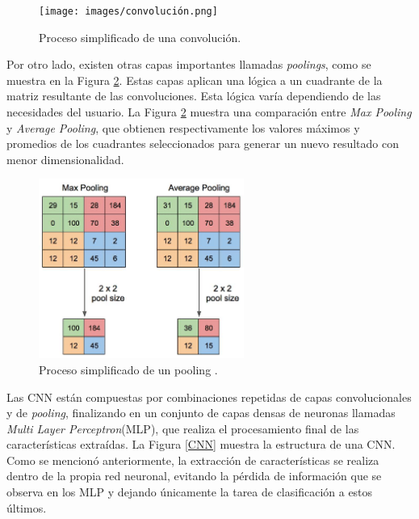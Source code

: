 \begin{figure}[h!] 
    \texttt{[image: images/convolución.png]} 
    \centering 
    \caption{Proceso simplificado de una convolución\protect\cite{convoluciones}.} 
    \label{convolucion} 
\end{figure}

Por otro lado, existen otras capas importantes llamadas
\textit{poolings}, como se muestra en la Figura \ref{pooling}.
Estas capas aplican una lógica a un cuadrante de la matriz
resultante de las convoluciones. Esta lógica varía dependiendo
de las necesidades del usuario. La Figura \ref{pooling} muestra una comparación
entre \textit{Max Pooling} y \textit{Average Pooling}, que obtienen
respectivamente los valores máximos y promedios de los cuadrantes
seleccionados para generar un nuevo resultado con menor dimensionalidad.

\begin{figure}[h!] 
    \includegraphics[width=0.6\textwidth]{images/pooling.png} 
    \centering 
    \caption{Proceso simplificado de un pooling \protect\cite{pooling}.} 
    \label{pooling} 
\end{figure}

Las CNN están compuestas por combinaciones repetidas de capas
convolucionales y de \textit{pooling}, finalizando en un conjunto 
de capas densas de neuronas llamadas \textit{Multi Layer 
Perceptron}(MLP), que realiza el procesamiento final de las 
características extraídas. La Figura \ref{CNN} muestra la 
estructura de una CNN. Como se mencionó anteriormente, 
la extracción de características se realiza dentro de la 
propia red neuronal, evitando la pérdida de información que 
se observa en los MLP y dejando únicamente la tarea de 
clasificación a estos últimos.


